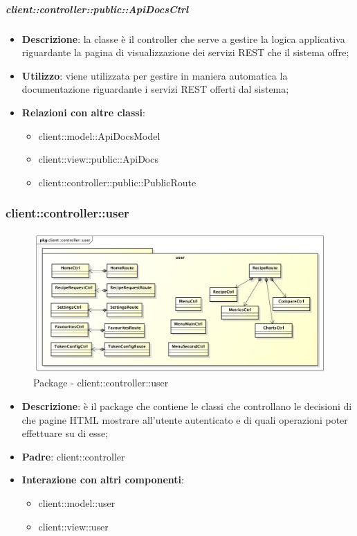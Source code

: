 		\subparagraph{client::controller::public::ApiDocsCtrl} %
		\label{subp:bdsm_app_client_controller_public_apidocsctrl}
		\begin{itemize}
			\item \textbf{Descrizione}: la classe è il controller che serve a gestire la logica applicativa riguardante la pagina di visualizzazione dei servizi REST che il sistema offre;
			\item \textbf{Utilizzo}: viene utilizzata per gestire in maniera automatica la documentazione riguardante i servizi REST offerti dal sistema;
			\item \textbf{Relazioni con altre classi}:
				\begin{itemize}
					\item client::model::ApiDocsModel
					\item client::view::public::ApiDocs
					\item client::controller::public::PublicRoute
				\end{itemize}
		\end{itemize}





\subsubsection{client::controller::user} %
\label{ssub:bdsm_app_client_controller_user}
\begin{figure}[htbp]
	\centering
	\centerline{\includegraphics[scale=0.45]{./images/client/client_controller_user.pdf}}
	\caption{Package - client::controller::user}
\end{figure}

\begin{itemize}
	\item \textbf{Descrizione}: è il package che contiene le classi che controllano le decisioni di che pagine HTML mostrare all'utente autenticato e di quali operazioni poter effettuare su di esse;
	\item \textbf{Padre}: client::controller
	\item \textbf{Interazione con altri componenti}:
		\begin{itemize}
			\item client::model::user
			\item client::view::user
		\end{itemize}
\end{itemize}

